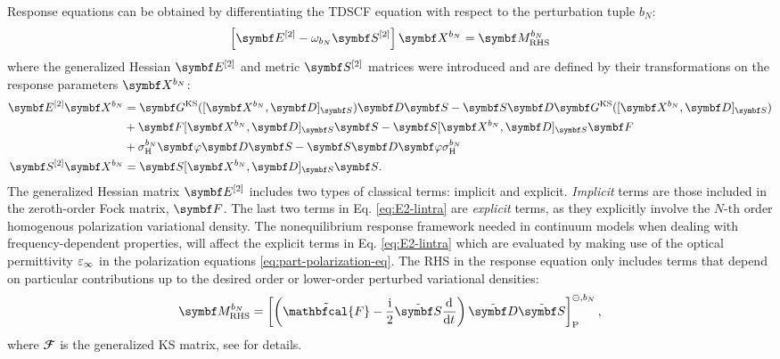 Response equations can be obtained by differentiating the
\acrshort{TDSCF} equation with respect to the perturbation tuple
$b_N$:\autocite{Thorvaldsen2008-sg, Ringholm2014-gx}
\begin{equation}\label{eq:response-equation}
 \left[\genHessian - \omega_{b_N}\genMetric \right]\rspParam{b_N} = \RHS{b_N}
\end{equation}
where the generalized Hessian $\genHessian$ and metric $\genMetric$
matrices were introduced and are defined by their transformations on the
response parameters $\rspParam{b_N}$:\autocite{Larsen2000-hj,
Kjaergaard2008-hy}
\begin{subequations}
\begin{align}
  \genHessian\rspParam{b_N} &=
  \mat{G}^\mathrm{KS}([\rspParam{b_N}, \mat{D}]_{\mat{S}})\mat{D}\mat{S}
  -\mat{S}\mat{D}\mat{G}^\mathrm{KS}([\rspParam{b_N},
  \mat{D}]_{\mat{S}}) \nonumber \\
&+\mat{F} [\rspParam{b_N}, \mat{D}]_{\mat{S}} \mat{S}
-\mat{S} [\rspParam{b_N}, \mat{D}]_{\mat{S}} \mat{F}
\label{eq:E2-lintra} \\
&+ \ASCh{b_N}\mat{\esp}\mat{D}\mat{S}
-\mat{S}\mat{D}\mat{\esp}\ASCh{b_N} \nonumber
\\
  \genMetric\rspParam{b_N} &= \mat{S} [\rspParam{b_N}, \mat{D}]_{\mat{S}} \mat{S} \text{.}
  \label{eq:S2-lintra}
\end{align}
\end{subequations}
The generalized Hessian matrix $\genHessian$ includes two types of
classical terms: implicit and explicit. \emph{Implicit} terms are those
included in the zeroth-order Fock matrix, $\mat{F}$.
The last two terms in Eq. \ref{eq:E2-lintra} are \emph{explicit} terms,
as they explicitly involve the $N$-th order homogenous polarization
variational density.
The nonequilibrium response framework needed in continuum models when
dealing with frequency-dependent properties,\autocite{Cammi1999-rb, Tomasi2005-vm}
will affect the explicit terms in Eq. \ref{eq:E2-lintra} which are
evaluated by making use of the optical permittivity $\varepsilon_\infty$ in the
polarization equations \eqref{eq:part-polarization-eq}.
The \acrlong{RHS} in the response equation only includes terms that
depend on particular contributions up to the desired order or
lower-order perturbed variational densities:\autocite{Ringholm2014-gx}
\begin{equation}\label{eq:RHS}
  \RHS{b_N} =
  \left[\left( \tilde{\mathbfcal{F}}
-
\frac{\mathrm{i}}{2}\pertmat{S}\deriv{}{t}\right)\pertmat{D}\pertmat{S}\right]^{\ominus,
b_N}_\mathrm{P},
\end{equation}
where $\mathbfcal{F}$ is the generalized \acrshort{KS} matrix, see
 for details.

